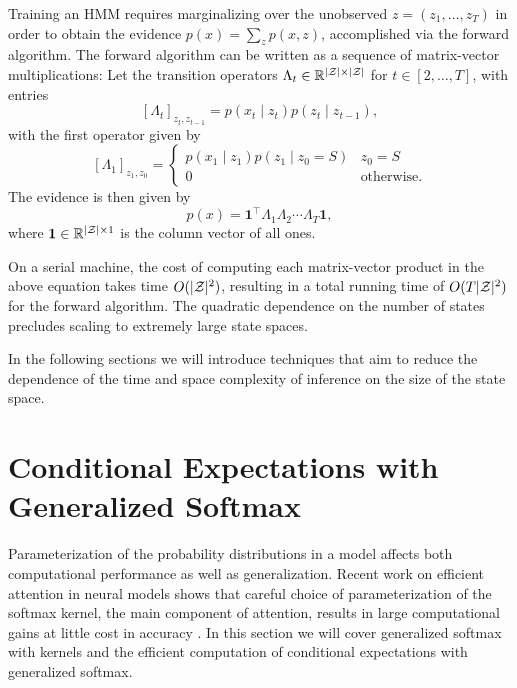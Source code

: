 \documentclass{article}
\begin{document}
Training an HMM requires marginalizing over the unobserved
$z = (z_1,\ldots,z_T)$ in order to obtain the evidence $p(x) = \sum_z p(x,z)$,
accomplished via the forward algorithm.
The forward algorithm can be written as a sequence of matrix-vector multiplications:
Let the transition operators $\Lambda_t\in\mathbb{R}^{|\mathcal{Z}|\times|\mathcal{Z}|}$ for $t\in[2,\ldots,T]$, 
with entries $$[\Lambda_t]_{z_t,z_{t-1}} = p(x_t\mid z_t)p(z_t\mid z_{t-1}),$$
with the first operator given by
$$[\Lambda_1]_{z_1,z_0} = \begin{cases}
p(x_1 \mid z_1) p(z_1 \mid z_0=S) & z_0 = S\\
0 & \textrm{otherwise}.
\end{cases}
$$
The evidence is then given by
\begin{equation}
p(x) = \mathbf{1}^\top\Lambda_1\Lambda_2\cdots\Lambda_T\mathbf{1},
\end{equation}
where $\mathbf{1}\in\mathbb{R}^{|\mathcal{Z}|\times1}$ is the column vector of all ones.

On a serial machine, the cost of computing each matrix-vector product in
the above equation takes time $O(|\mathcal{Z}|^2)$, resulting in a total
running time of $O(T|\mathcal{Z}|^2)$ for the forward algorithm.
The quadratic dependence on the number of states precludes
scaling to extremely large state spaces.

In the following sections we will introduce techniques that
aim to reduce the dependence of the time and space complexity
of inference on the size of the state space.

\section{Conditional Expectations with Generalized Softmax}
Parameterization of the probability distributions in a model affects both
computational performance as well as generalization.
Recent work on efficient attention in neural models shows that careful choice of parameterization
of the softmax kernel, the main component of attention,
results in large computational gains at little cost in accuracy
\citep{choromanski2020performer,peng2021rfa}.
In this section we will cover generalized softmax with kernels and the
efficient computation of conditional expectations with generalized softmax.
\end{document}
